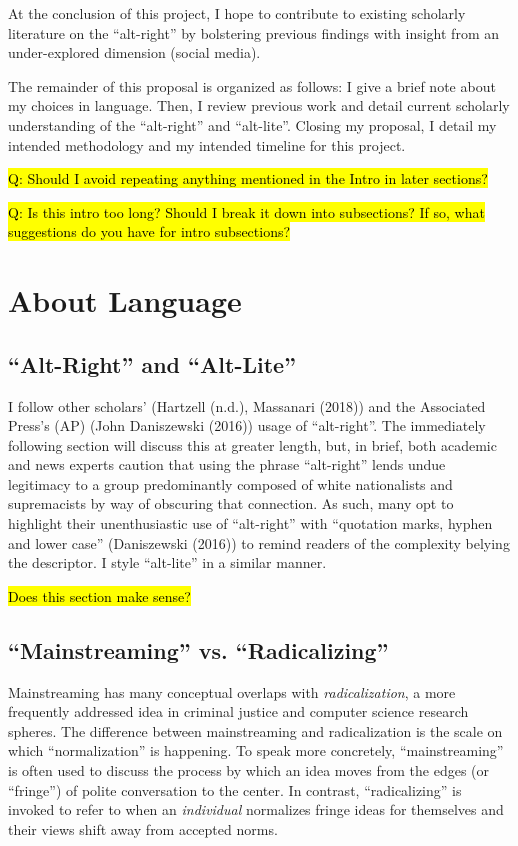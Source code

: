\documentclass[acmlarge, screen, authorversion]{acmart}
\begin{document}
At the conclusion of this project, I hope to contribute to existing
scholarly literature on the “alt-right” by bolstering previous findings
with insight from an under-explored dimension (social media).

The remainder of this proposal is organized as follows: I give a brief
note about my choices in language. Then, I review previous work and
detail current scholarly understanding of the “alt-right” and
“alt-lite”. Closing my proposal, I detail my intended methodology and my
intended timeline for this project.

\hl{Q: Should I avoid repeating anything mentioned in the Intro in later sections?}

\hl{Q: Is this intro too long? Should I break it down into subsections? If so, what suggestions do you have for intro subsections?}

\section{About Language}

\subsection{“Alt-Right” and “Alt-Lite”}

I follow other scholars’ (Hartzell (n.d.), Massanari (2018)) and the
Associated Press’s (AP) (John Daniszewski (2016)) usage of “alt-right”.
The immediately following section will discuss this at greater length,
but, in brief, both academic and news experts caution that using the
phrase “alt-right” lends undue legitimacy to a group predominantly
composed of white nationalists and supremacists by way of obscuring that
connection. As such, many opt to highlight their unenthusiastic use of
“alt-right” with “quotation marks, hyphen and lower case” 
(Daniszewski (2016)) to remind readers of the complexity belying the
descriptor. I style “alt-lite” in a similar manner.

\hl{Does this section make sense?}

\subsection{“Mainstreaming” vs. “Radicalizing”}

Mainstreaming has many
conceptual overlaps with \textit{radicalization}, a more frequently addressed
idea in criminal justice and computer science research spheres. The
difference between mainstreaming and radicalization is the scale on
which “normalization” is happening. To speak more concretely,
“mainstreaming” is often used to discuss the process by which an idea
moves from the edges (or “fringe”) of polite conversation to the center.
In contrast, “radicalizing” is invoked to refer to when an \textit{individual}
normalizes fringe ideas for themselves and their views shift away from
accepted norms.
\end{document}
